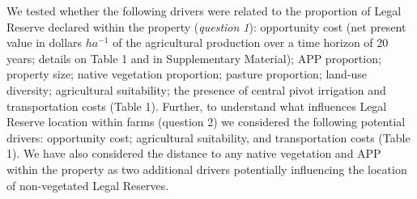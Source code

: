 \documentclass[
	12pt,				%
	oneside,			%
	a4paper,			%
	chapter=TITLE,		%
	section=TITLE,		%
	brazil,			%
	english				%
	]{abntex2}
\begin{document}
We tested whether the following drivers were related to the proportion of Legal Reserve declared within the property (\emph{question 1}): opportunity cost (net present value in dollars \(ha^{-1}\) of the agricultural production over a time horizon of 20 years; details on Table 1 and in Supplementary Material); APP proportion; property size; native vegetation proportion; pasture proportion; land-use diversity; agricultural suitability; the presence of central pivot irrigation and transportation costs (Table 1). Further, to understand what influences Legal Reserve location within farms (question 2) we considered the following potential drivers: opportunity cost; agricultural suitability, and transportation costs (Table 1). We have also considered the distance to any native vegetation and APP within the property as two additional drivers potentially influencing the location of non-vegetated Legal Reserves.
\end{document}

